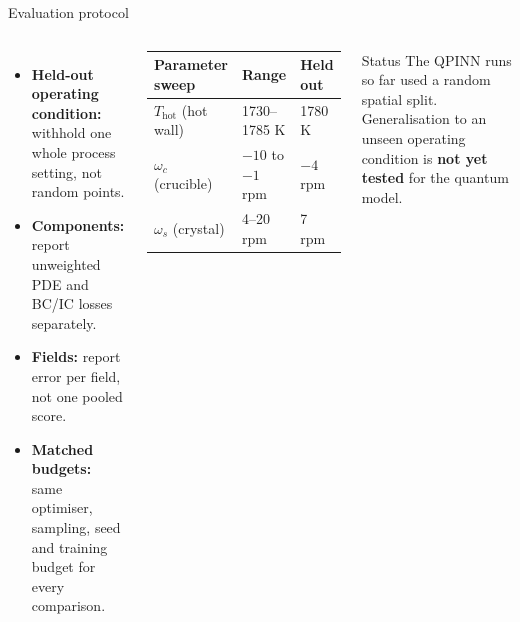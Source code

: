 \documentclass[aspectratio=169]{beamer}
\begin{document}
\begin{frame}{Evaluation protocol}
\begin{columns}[T,onlytextwidth]
\begin{itemize}
  \item \textbf{Held-out operating condition:} withhold one whole process setting, not random points.
  \item \textbf{Components:} report unweighted PDE and BC/IC losses separately.
  \item \textbf{Fields:} report error per field, not one pooled score.
  \item \textbf{Matched budgets:} same optimiser, sampling, seed and training budget for every comparison.
\end{itemize}
\begin{center}
\small
\begin{tabular}{lll}
\toprule
Parameter sweep & Range & Held out \\
\midrule
$T_{\mathrm{hot}}$ (hot wall) & 1730--1785 K & 1780 K \\
$\omega_c$ (crucible) & $-10$ to $-1$ rpm & $-4$ rpm \\
$\omega_s$ (crystal) & 4--20 rpm & 7 rpm \\
\bottomrule
\end{tabular}
\end{center}
\vspace{0.2cm}
\begin{alertblock}{Status}
\footnotesize The QPINN runs so far used a random spatial split. Generalisation to an unseen operating condition is \textbf{not yet tested} for the quantum model.
\end{alertblock}
\end{columns}
\end{frame}
\end{document}
